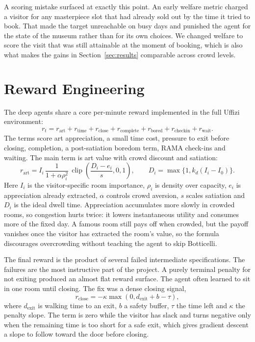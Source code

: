 \documentclass[11pt]{article}
\begin{document}
A scoring mistake surfaced at exactly this point. An early welfare metric charged a visitor for any
masterpiece slot that had already sold out by the time it tried to book. That made the target
unreachable on busy days and punished the agent for the state of the museum rather than for its own
choices. We changed welfare to score the visit that was still attainable at the moment of booking,
which is also what makes the gains in Section~\ref{sec:results} comparable across crowd levels.

\section{Reward Engineering}
\label{sec:reward}

The deep agents share a core per-minute reward implemented in the full Uffizi environment:
\[
r_t =
r_{\text{art}}+r_{\text{time}}+r_{\text{close}}+r_{\text{complete}}
+r_{\text{bored}}+r_{\text{checkin}}+r_{\text{wait}}.
\]
The terms score art appreciation, a small time cost, pressure to exit before closing, completion, a
post-satiation boredom term, RAMA check-ins and waiting. The main term is art value with crowd
discount and satiation:
\[
r_{\text{art}} =
I_i\,
\frac{1}{1+\alpha \rho_i^2}\,
\operatorname{clip}\!\left(\frac{D_i-e_i}{s},0,1\right),
\qquad
D_i=\max\{1,k_d(I_i-I_0)\}.
\]
Here $I_i$ is the visitor-specific room importance, $\rho_i$ is density over capacity, $e_i$ is
appreciation already extracted, $\alpha$ controls crowd aversion, $s$ scales satiation and $D_i$ is
the ideal dwell time. Appreciation accumulates more slowly in crowded rooms, so congestion hurts
twice: it lowers instantaneous utility and consumes more of the fixed day. A famous room still pays
off when crowded, but the payoff vanishes once the visitor has extracted the room's value, so the
formula discourages overcrowding without teaching the agent to skip Botticelli.

The final reward is the product of several failed intermediate specifications. The failures are
the most instructive part of the project. A purely terminal penalty for not exiting produced an almost
flat reward surface. The agent often learned to sit in one room until closing. The fix was a dense
closing signal,
\[
r_{\text{close}}=-\kappa\max(0,d_{\text{exit}}+b-\tau),
\]
where $d_{\text{exit}}$ is walking time to an exit, $b$ a safety buffer, $\tau$ the time left and
$\kappa$ the penalty slope. The term is zero while the visitor has slack and turns negative only when
the remaining time is too short for a safe exit, which gives gradient descent a slope to follow toward
the door before closing.
\end{document}
